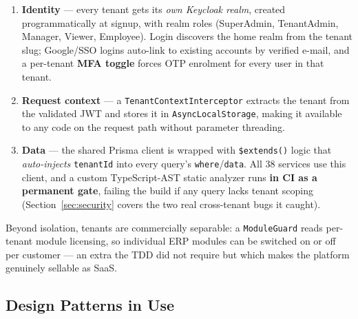 \documentclass[11pt,a4paper]{article}
\newcommand{\code}[1]{\texttt{\small #1}}
\begin{document}
\begin{enumerate}
  \item \textbf{Identity} --- every tenant gets its \emph{own Keycloak realm}, created
  programmatically at signup, with realm roles (SuperAdmin, TenantAdmin, Manager, Viewer,
  Employee). Login discovers the home realm from the tenant slug; Google/SSO logins
  auto-link to existing accounts by verified e-mail, and a per-tenant \textbf{MFA toggle}
  forces OTP enrolment for every user in that tenant.
  \item \textbf{Request context} --- a \code{TenantContextInterceptor} extracts the tenant
  from the validated JWT and stores it in \code{AsyncLocalStorage}, making it available to
  any code on the request path without parameter threading.
  \item \textbf{Data} --- the shared Prisma client is wrapped with \code{\$extends()} logic
  that \emph{auto-injects} \code{tenantId} into every query's \code{where}/\code{data}.
  All 38 services use this client, and a custom TypeScript-AST static analyzer runs
  \textbf{in CI as a permanent gate}, failing the build if any query lacks tenant scoping
  (Section~\ref{sec:security} covers the two real cross-tenant bugs it caught).
\end{enumerate}

Beyond isolation, tenants are commercially separable: a \code{ModuleGuard} reads
per-tenant module licensing, so individual ERP modules can be switched on or off per
customer --- an extra the TDD did not require but which makes the platform genuinely
sellable as SaaS.

\subsection{Design Patterns in Use}
\end{document}
